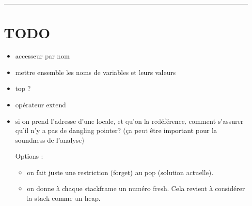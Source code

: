 \begin{center}\rule{3in}{0.4pt}\end{center}

\section*{TODO}

\begin{itemize}
\item accesseur par nom
\item mettre ensemble les noms de variables et leurs valeurs
\item top ?
\item opérateur extend
\item
  si on prend l'adresse d'une locale, et qu'on la redéférence, comment s'assurer
  qu'il n'y a pas de dangling pointer? (ça peut être important pour la soundness
  de l'analyse)

  Options :

\begin{itemize}
\item
  on fait juste une restriction (forget) au pop (solution actuelle).
\item
  on donne à chaque stackframe un numéro fresh. Cela revient à considérer la
  stack comme un heap.
\end{itemize}

\end{itemize}

